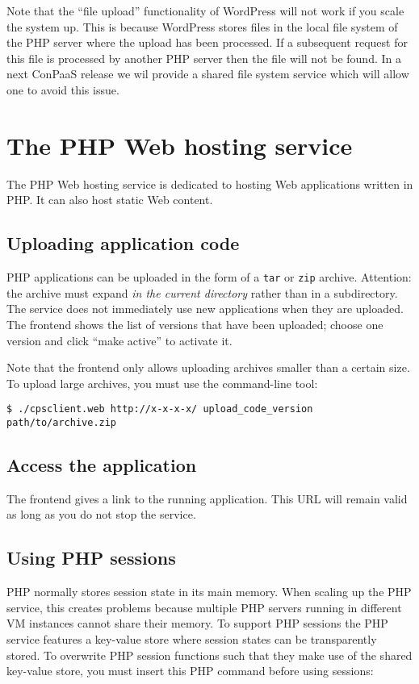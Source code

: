 \documentclass[10pt]{article}
\begin{document}
Note that the ``file upload'' functionality of WordPress will not work
if you scale the system up. This is because WordPress stores files in
the local file system of the PHP server where the upload has been
processed. If a subsequent request for this file is processed by
another PHP server then the file will not be found. In a next ConPaaS
release we wil provide a shared file system service which will allow
one to avoid this issue.


\section{The PHP Web hosting service}

The PHP Web hosting service is dedicated to hosting Web applications
written in PHP. It can also host static Web content.

\subsection{Uploading application code}

PHP applications can be uploaded in the form of a \texttt{tar} or
\texttt{zip} archive.  Attention: the archive must expand \emph{in the
  current directory} rather than in a subdirectory. The service does
not immediately use new applications when they are uploaded. The
frontend shows the list of versions that have been uploaded; choose
one version and click ``make active'' to activate it.

Note that the frontend only allows uploading archives smaller than a
certain size.  To upload large archives, you must use the command-line
tool:
\begin{verbatim}
$ ./cpsclient.web http://x-x-x-x/ upload_code_version path/to/archive.zip
\end{verbatim}

\subsection{Access the application}

The frontend gives a link to the running application. This URL will
remain valid as long as you do not stop the service.

\subsection{Using PHP sessions}

PHP normally stores session state in its main memory. When scaling up
the PHP service, this creates problems because multiple PHP servers
running in different VM instances cannot share their memory. To
support PHP sessions the PHP service features a key-value store where
session states can be transparently stored. To overwrite PHP session
functions such that they make use of the shared key-value store, you
must insert this PHP command before using sessions:
\end{document}
